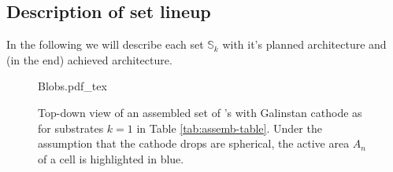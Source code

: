 \documentclass[a4paper,10pt,twocolumn]{article}
\begin{document}
\begin{extract*}
\subsection{Description of set lineup}
In the following we will describe each set $\mathbb{S}_k$ with it's planned architecture and (in the end) achieved architecture.

\begin{figure}[h]\centering
	{Blobs.pdf_tex}
	\caption{Top-down view of an assembled set of \BHSC's with Galinstan cathode as for substrates $k=1$ in Table \ref{tab:assemb-table}. Under the assumption that the cathode drops are spherical, the active area $A_n$ of a cell is highlighted in blue.}
	\label{fig:blobs}
\end{figure}


\end{extract*}
\end{document}
